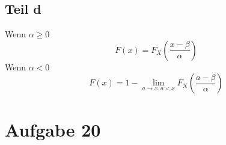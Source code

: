 \documentclass[10pt,a4paper]{article}
\begin{document}
\subsection{Teil d}
Wenn $\alpha \ge 0$
\begin{equation}
  F(x) = F_{X}(\frac{x - \beta}{\alpha})
\end{equation}
Wenn $\alpha < 0$
\begin{equation}
  F(x) = 1 - \lim_{a \rightarrow x, a < x} F_{X}(\frac{a - \beta}{\alpha})
\end{equation}

\section{Aufgabe 20}
\end{document}

